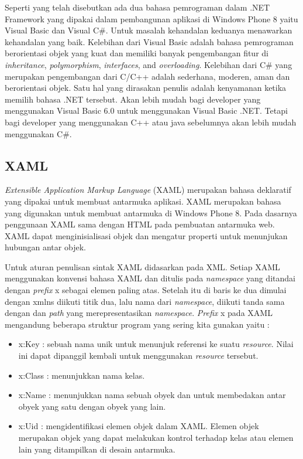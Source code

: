Seperti yang telah disebutkan ada dua bahasa pemrograman dalam .NET Framework yang dipakai dalam pembangunan aplikasi di Windows Phone 8 yaitu Visual Basic dan Visual C\#. Untuk masalah kehandalan keduanya menawarkan kehandalan yang baik. Kelebihan dari Visual Basic adalah bahasa pemrograman berorientasi objek yang kuat dan memiliki banyak pengembangan fitur di \textit{inheritance}, \textit{polymorphism}, \textit{interfaces}, and \textit{overloading}\cite{MSDN}. Kelebihan dari C\# yang merupakan pengembangan dari C/C++ adalah sederhana, moderen, aman dan berorientasi objek\cite{MSDN}. Satu hal yang dirasakan penulis adalah kenyamanan ketika memilih bahasa .NET tersebut. Akan lebih mudah bagi developer yang menggunakan Visual Basic 6.0  untuk menggunakan Visual \newline Basic .NET. Tetapi bagi  developer yang menggunakan C++ atau java sebelumnya akan lebih mudah menggunakan C\#.

\subsection{XAML}
\label{subsec:XAML}
\hspace{0.5cm} \textit{Extensible Application Markup Language} (XAML) merupakan bahasa deklaratif yang dipakai untuk membuat antarmuka aplikasi. XAML merupakan bahasa yang digunakan untuk membuat antarmuka di Windows Phone 8\cite{Manning}. Pada dasarnya penggunaan XAML sama dengan HTML pada pembuatan antarmuka web. XAML dapat menginisialisasi objek dan mengatur properti untuk menunjukan hubungan antar objek.

Untuk aturan penulisan sintak XAML didasarkan pada XML. Setiap XAML menggunakan konvensi bahasa XAML dan ditulis pada \textit{namespace} yang ditandai dengan \textit{prefix} x sebagai elemen paling atas. Setelah itu di baris ke dua dimulai dengan xmlns diikuti titik dua, lalu nama dari \textit{namespace}, diikuti tanda sama dengan dan \textit{path} yang merepresentasikan \textit{namespace}\cite{Manning}.
\textit{Prefix} x pada XAML mengandung beberapa struktur program yang sering kita gunakan yaitu :
\begin{itemize}
	\item x:Key : sebuah nama unik untuk menunjuk referensi ke suatu \textit{resource}. Nilai ini dapat dipanggil kembali untuk menggunakan \textit{resource} tersebut.
	\item x:Class : menunjukkan nama kelas.
	\item x:Name : menunjukkan nama sebuah obyek dan untuk membedakan antar obyek yang satu dengan obyek yang lain.
	\item x:Uid : mengidentifikasi elemen objek dalam XAML. Elemen objek merupakan objek yang dapat melakukan kontrol terhadap kelas atau elemen lain yang ditampilkan di desain antarmuka.
\end{itemize}	

